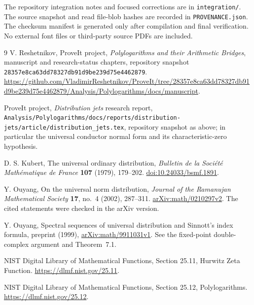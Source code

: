 \documentclass[11pt]{article}
\numberwithin{equation}{section}
\theoremstyle{definition}
\theoremstyle{remark}
\newcommand{\code}[1]{\texttt{\small #1}}
\newcommand{\src}[1]{\nolinkurl{#1}}
\newcommand{\snap}{28357e8ca63dd78327db91d9be239d75e4462879}
\begin{document}
The repository integration notes and focused corrections are in
\code{integration/}. The source snapshot and read file-blob hashes are
recorded in \code{PROVENANCE.json}. The checksum manifest is generated
only after compilation and final verification. No external font files
or third-party source PDFs are included.

\clearpage
\begin{thebibliography}{9}
V. Reshetnikov, ProveIt project,
\emph{Polylogarithms and their Arithmetic Bridges}, manuscript and
research-status chapters, repository snapshot \texttt{\snap}.
\url{https://github.com/VladimirReshetnikov/ProveIt/tree/28357e8ca63dd78327db91d9be239d75e4462879/Analysis/Polylogarithms/docs/manuscript}.

ProveIt project, \emph{Distribution jets} research report,
\src{Analysis/Polylogarithms/docs/reports/distribution-jets/article/distribution_jets.tex},
repository snapshot as above; in particular the universal conductor
normal form and its characteristic-zero hypothesis.

D. S. Kubert, The universal ordinary distribution,
\emph{Bulletin de la Soci\'et\'e Math\'ematique de France}
\textbf{107} (1979), 179--202.
\href{https://doi.org/10.24033/bsmf.1891}{doi:10.24033/bsmf.1891}.

Y. Ouyang, On the universal norm distribution,
\emph{Journal of the Ramanujan Mathematical Society}
\textbf{17}, no.~4 (2002), 287--311.
\href{https://arxiv.org/abs/math/0210297}{arXiv:math/0210297v2}.
The cited statements were checked in the arXiv version.

Y. Ouyang, Spectral sequences of universal distribution and Sinnott's
index formula, preprint (1999),
\href{https://arxiv.org/abs/math/9911031}{arXiv:math/9911031v1}.
See the fixed-point double-complex argument and Theorem~7.1.

NIST Digital Library of Mathematical Functions,
Section 25.11, Hurwitz Zeta Function.
\url{https://dlmf.nist.gov/25.11}.

NIST Digital Library of Mathematical Functions,
Section 25.12, Polylogarithms.
\url{https://dlmf.nist.gov/25.12}.
\end{thebibliography}
\end{document}
